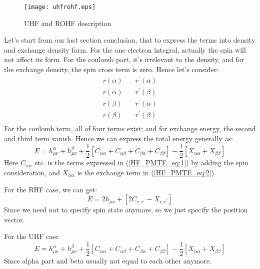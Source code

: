\begin{figure}[htbp]
\begin{center}
\texttt{[image: uhfrohf.eps]}
\caption{UHF and ROHF description}
\label{HFTpic:4}
\end{center}
\end{figure}

Let's start from our last section conclusion, that to express the terms into
density and exchange density form. For the one electron integral, actually the
spin will not affect its form. For the coulomb part, it's irrelevant to the
density, and for the exchange density, the spin cross term is zero. Hence let's
consider:
\begin{align}\label{}
r(\alpha) \quad &  r^{'}(\alpha) \nonumber \\
r(\alpha) \quad &  r^{'}(\beta) \nonumber \\
r(\beta) \quad &  r^{'}(\alpha) \nonumber \\
r(\beta) \quad &  r^{'}(\beta) \nonumber \\
\end{align}
For the coulomb term, all of four terms exist; and for exchange energy, the
second and third term vanish. Hence we can express the total energy generally
as:
\begin{equation}
  E = h_{\mu\nu}^{\alpha} + h_{\mu\nu}^{\beta} 
   + \frac{1}{2}\left[ C_{\alpha\alpha} + 
C_{\alpha\beta} + C_{\beta\alpha} + C_{\beta\beta}\right] -
\frac{1}{2}\left[ X_{\alpha\alpha} + X_{\beta\beta} \right] 
\end{equation}
Here $C_{\alpha\alpha}$ etc. is the terms expressed in (\ref{HF_PMTE_eq:1}) by
adding the spin consideration, and $X_{\alpha\alpha}$ is the exchange term in 
(\ref{HF_PMTE_eq:2}).

For the RHF case, we can get:
\begin{equation}\label{HFTeq:23}
  E = 2h_{\mu\nu} 
   + \left[ 2C_{r, r^{'}}  -  X_{r, r^{'}}  \right] 
\end{equation}
Since we need not to specify spin state anymore, so we just specify the
position vector.

For the UHF case
\begin{equation}\label{HFTeq:27}
  E = h_{\mu\nu}^{\alpha} + h_{\mu\nu}^{\beta}  
   + \frac{1}{2}\left[ C_{\alpha\alpha} + 
C_{\alpha\beta} + C_{\beta\alpha} + C_{\beta\beta}\right] -
\frac{1}{2}\left[ X_{\alpha\alpha} + X_{\beta\beta} \right] 
\end{equation}
Since alpha part and beta usually not equal to each other anymore.


